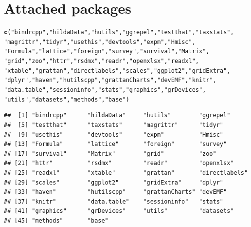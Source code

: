\documentclass{grattan}\usepackage[]{graphicx}\usepackage[]{color}
\makeatletter
\newcommand{\hlstr}[1]{\textcolor[rgb]{0.192,0.494,0.8}{#1}}%
\newcommand{\hlstd}[1]{\textcolor[rgb]{0.345,0.345,0.345}{#1}}%
\newcommand{\hlkwd}[1]{\textcolor[rgb]{0.737,0.353,0.396}{\textbf{#1}}}%
\newenvironment{kframe}{%
 \def\at@end@of@kframe{}%
 \ifinner\ifhmode%
  \def\at@end@of@kframe{\end{minipage}}%
  \begin{minipage}{\columnwidth}%
 \fi\fi%
 \def\FrameCommand##1{\hskip\@totalleftmargin \hskip-\fboxsep
 \colorbox{shadecolor}{##1}\hskip-\fboxsep
     \hskip-\linewidth \hskip-\@totalleftmargin \hskip\columnwidth}%
 \MakeFramed {\advance\hsize-\width
   \@totalleftmargin\z@ \linewidth\hsize
   \@setminipage}}%
 {\par\unskip\endMakeFramed%
 \at@end@of@kframe}
\newenvironment{knitrout}{}{} %
\makeatother
\begin{document}
\clearpage
\section{Attached packages}
\begin{knitrout}
\color{fgcolor}\begin{kframe}
\begin{alltt}
\hlkwd{c}\hlstd{(}\hlstr{"bindrcpp"}\hlstd{,} \hlstr{"hildaData"}\hlstd{,} \hlstr{"hutils"}\hlstd{,} \hlstr{"ggrepel"}\hlstd{,} \hlstr{"testthat"}\hlstd{,} \hlstr{"taxstats"}\hlstd{,}
\hlstr{"magrittr"}\hlstd{,} \hlstr{"tidyr"}\hlstd{,} \hlstr{"usethis"}\hlstd{,} \hlstr{"devtools"}\hlstd{,} \hlstr{"expm"}\hlstd{,} \hlstr{"Hmisc"}\hlstd{,}
\hlstr{"Formula"}\hlstd{,} \hlstr{"lattice"}\hlstd{,} \hlstr{"foreign"}\hlstd{,} \hlstr{"survey"}\hlstd{,} \hlstr{"survival"}\hlstd{,} \hlstr{"Matrix"}\hlstd{,}
\hlstr{"grid"}\hlstd{,} \hlstr{"zoo"}\hlstd{,} \hlstr{"httr"}\hlstd{,} \hlstr{"rsdmx"}\hlstd{,} \hlstr{"readr"}\hlstd{,} \hlstr{"openxlsx"}\hlstd{,} \hlstr{"readxl"}\hlstd{,}
\hlstr{"xtable"}\hlstd{,} \hlstr{"grattan"}\hlstd{,} \hlstr{"directlabels"}\hlstd{,} \hlstr{"scales"}\hlstd{,} \hlstr{"ggplot2"}\hlstd{,} \hlstr{"gridExtra"}\hlstd{,}
\hlstr{"dplyr"}\hlstd{,} \hlstr{"haven"}\hlstd{,} \hlstr{"hutilscpp"}\hlstd{,} \hlstr{"grattanCharts"}\hlstd{,} \hlstr{"devEMF"}\hlstd{,} \hlstr{"knitr"}\hlstd{,}
\hlstr{"data.table"}\hlstd{,} \hlstr{"sessioninfo"}\hlstd{,} \hlstr{"stats"}\hlstd{,} \hlstr{"graphics"}\hlstd{,} \hlstr{"grDevices"}\hlstd{,}
\hlstr{"utils"}\hlstd{,} \hlstr{"datasets"}\hlstd{,} \hlstr{"methods"}\hlstd{,} \hlstr{"base"}\hlstd{)}
\end{alltt}
\begin{verbatim}
##  [1] "bindrcpp"      "hildaData"     "hutils"        "ggrepel"      
##  [5] "testthat"      "taxstats"      "magrittr"      "tidyr"        
##  [9] "usethis"       "devtools"      "expm"          "Hmisc"        
## [13] "Formula"       "lattice"       "foreign"       "survey"       
## [17] "survival"      "Matrix"        "grid"          "zoo"          
## [21] "httr"          "rsdmx"         "readr"         "openxlsx"     
## [25] "readxl"        "xtable"        "grattan"       "directlabels" 
## [29] "scales"        "ggplot2"       "gridExtra"     "dplyr"        
## [33] "haven"         "hutilscpp"     "grattanCharts" "devEMF"       
## [37] "knitr"         "data.table"    "sessioninfo"   "stats"        
## [41] "graphics"      "grDevices"     "utils"         "datasets"     
## [45] "methods"       "base"
\end{verbatim}
\end{kframe}
\end{knitrout}
\end{document}
